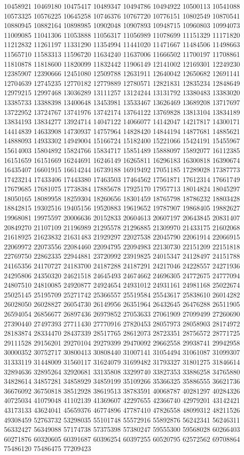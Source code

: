 10458921
10469180
10475417
10489347
10494786
10494922
10500113
10541088
10573325
10576225
10645258
10746376
10767720
10776151
10802549
10870541
10880945
10882164
10898985
10902048
10907893
10948715
10960803
10994073
11009085
11041306
11053888
11056317
11056989
11078699
11151329
11171820
11212832
11261197
11331290
11354994
11441020
11471667
11484506
11498663
11565710
11583313
11596720
11634240
11637006
11666502
11700197
11708861
11810878
11818600
11820099
11832442
11906149
12141002
12169301
12249230
12385907
12390666
12451080
12509788
12631911
12640042
12650682
12691141
12704639
12745235
12770182
12779889
12780571
12821831
12835234
12848649
12979215
12997468
13036289
13111257
13124244
13131792
13380483
13383020
13385733
13388398
13400648
13453981
13533467
13626469
13689208
13717697
13722952
13724767
13741976
13742174
13764122
13769828
13813104
13834189
13834193
13834277
13924714
14047122
14066077
14142047
14217817
14300171
14414839
14633908
14730937
14757964
14828420
14844194
14877681
14885621
14888093
14933302
14949004
15166724
15182400
15221066
15424191
15455967
15614003
15804892
15824766
15834717
15851489
15888097
15892077
16112385
16151659
16151669
16244691
16246149
16265811
16296183
16300818
16390674
16435407
16601915
16614244
16739188
16919492
17051185
17289028
17387773
17423214
17433406
17443380
17463503
17464562
17561871
17612314
17661749
17679685
17681075
17738384
17885678
17925170
17957713
18014824
18045297
18050165
18089958
18259304
18260656
18301459
18765798
18786232
18803428
18842815
19302516
19405156
19520883
19619652
19787907
19868405
19882627
19968081
19975597
20006636
20152833
20604613
20607197
20643845
20831407
20849270
21107109
21196989
21295578
21296885
21309970
21433175
21602068
21618925
21623832
21631483
21929297
22027538
22045790
22061914
22066915
22069972
22073556
22084460
22094795
22094983
22130730
22151209
22151818
22769750
22862335
22944881
23720992
23919825
24015347
24128497
24151788
24165356
24170727
24183700
24187288
24187291
24217046
24228557
24271936
24295806
24350320
24621518
24645493
24674662
24696305
24772675
24777094
24807510
24810085
24920877
24924654
24931012
24931161
24981168
25022674
25025145
25195709
25271742
25366557
25519584
25543617
25838610
26014282
26028050
26028827
26054730
26149956
26351964
26432645
26476288
26511905
26594054
26856677
26897436
26979852
27053633
27061909
27099499
27260690
27390440
27497393
27711430
27770916
27820453
28057973
28058903
28174972
28183874
28334470
28437339
28517765
28612073
28723351
28756572
28771725
29111528
29156201
29270104
29279399
29470092
29662558
29938741
29942958
30000352
30752717
30800413
30808440
31007141
31054494
31061087
31099307
31333119
31448009
31560117
31624079
31699482
31793327
31801275
31846614
32894636
32895264
32920681
33135808
33299740
33827353
33886258
34765880
34828614
34857281
34858929
34859199
35109266
35366325
35886555
36621736
36676092
36750818
38512928
38619513
38783591
40068787
40281297
40284326
40725034
41079048
41102139
41369607
42297655
42366740
42979201
43142421
43173133
43624041
45659376
46774896
47787410
47826558
48099312
48211526
49308459
52763732
53298035
55101748
55572916
55892876
56242341
56246311
56332427
56349088
57174738
57375398
57380247
59555300
59568028
60266403
60271876
60320605
60391687
60396254
60397255
60520795
62572562
69708864
75486120
75486475
77209423


